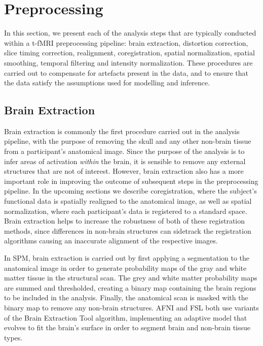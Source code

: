 \section{Preprocessing}

In this section, we present each of the analysis steps that are typically conducted within a t-fMRI preprocessing pipeline: brain extraction, distortion correction, slice timing correction, realignment, coregistration, spatial normalization, spatial smoothing, temporal filtering and intensity normalization. These procedures are carried out to compensate for artefacts present in the data, and to ensure that the data satisfy the assumptions used for modelling and inference. 

\subsection{Brain Extraction}

Brain extraction is commonly the first procedure carried out in the analysis pipeline, with the purpose of removing the skull and any other non-brain tissue from a participant's anatomical image. Since the purpose of the analysis is to infer areas of activation \textit{within} the brain, it is sensible to remove any external structures that are not of interest. However, brain extraction also has a more important role in improving the outcome of subsequent steps in the preprocessing pipeline. In the upcoming sections we describe coregistration, where the subject's functional data is spatially realigned to the anatomical image, as well as spatial normalization, where each participant's data is registered to a standard space. Brain extraction helps to increase the robustness of both of these registration methods, since differences in non-brain structures can sidetrack the registration algorithms causing an inaccurate alignment of the respective images. 

In SPM, brain extraction is carried out by first applying a segmentation to the anatomical image in order to generate probability maps of the gray and white matter tissue in the structural scan. The grey and white matter probability maps are summed and thresholded, creating a binary map containing the brain regions to be included in the analysis. Finally, the anatomical scan is masked with the binary map to remove any non-brain structures. AFNI and FSL both use variants of the Brain Extraction Tool \citep{Smith2002-vw} algorithm, implementing an adaptive model that evolves to fit the brain's surface in order to segment brain and non-brain tissue types. 

